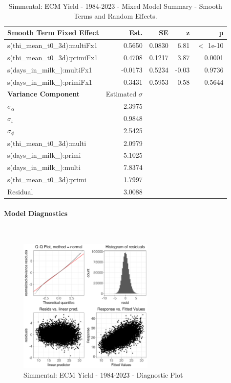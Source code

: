 \newpage
\begin{table}[H]
\centering
\begin{tabular}
{l | r | r | r | r}
\textbf{Smooth Term Fixed Effect} & Est. & SE & z & p\\
\hline
\hline
s(thi\_mean\_t0\_3d):multiFx1 & 0.5650 & 0.0830 & 6.81 & $<$ 1e-10\\
s(thi\_mean\_t0\_3d):primiFx1 & 0.4708 & 0.1217 & 3.87 & 0.0001\\
s(days\_in\_milk\_):multiFx1 & -0.0173 & 0.5234 & -0.03 & 0.9736\\
s(days\_in\_milk\_):primiFx1 & 0.3431 & 0.5953 & 0.58 & 0.5644\\
\hline
\textbf{Variance Component} & Estimated $\sigma$ & & & \\
\hline
\hline
$\sigma_\alpha$ & 2.3975 & & & \\
$\sigma_\iota$ & 0.9848 & & & \\
$\sigma_\phi$ & 2.5425 & & & \\
s(thi\_mean\_t0\_3d):multi &  2.0979 & & & \\
s(days\_in\_milk\_):primi & 5.1025 & & & \\
s(days\_in\_milk\_):multi & 7.8374 & & & \\
s(thi\_mean\_t0\_3d):primi & 1.7997 & & & \\
Residual & 3.0088 & & & \\
\end{tabular}
\caption[]{Simmental: ECM Yield - 1984-2023 - Mixed Model Summary - Smooth Terms and Random Effects.}
\end{table}



\paragraph{Model Diagnostics} \quad \\
\begin{figure}[H]
    \centering
    \includegraphics[width=0.6\textwidth]{thesis/figures/models/ecm/full/si_ecm_full/si_ecm_full_diagnostics.png}
    \caption[]{Simmental: ECM Yield - 1984-2023 - Diagnostic Plot}
\end{figure}

